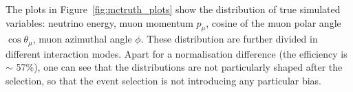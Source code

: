 The plots in Figure~\ref{fig:mctruth_plots} show the distribution of true \g simulated variables: neutrino energy, muon momentum $p_\mu$, cosine of the muon polar angle $\cos\theta_\mu$, muon azimuthal angle $\phi$. These distribution are further divided in different \g interaction modes. Apart for a normalisation difference (the efficiency is $\sim$ 57\%), one can see that the distributions are not particularly shaped after the selection, so that the event selection is not introducing any particular bias.

\begin{figure}[t]
\centering
{} \quad
{} \quad
{} \quad
{}
\end{figure}
